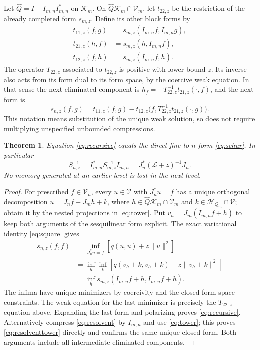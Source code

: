 \documentclass[11pt]{article}
\newtheorem{theorem}{Theorem}[section]
\newcommand{\HH}{\mathscr H}
\newcommand{\KK}{\mathscr K}
\newcommand{\LL}{\mathscr L}
\newcommand{\VV}{\mathscr V}
\begin{document}
Let $\widehat Q=I-I_{m,n}I_{m,n}^*$ on $\KK_m$. On
$\widehat Q\KK_m\cap\VV_m$, let $t_{22,z}$ be the restriction of the
already completed form $s_{m,z}$. Define its other block forms by
\begin{align*}
 t_{11,z}(f,g)&=s_{m,z}(I_{m,n}f,I_{m,n}g),\\
 t_{21,z}(h,f)&=s_{m,z}(h,I_{m,n}f),\\
 t_{12,z}(f,h)&=s_{m,z}(I_{m,n}f,h).
\end{align*}
The operator $T_{22,z}$ associated to $t_{22,z}$ is positive with lower
bound $z$. Its inverse also acts from its form dual to its form space,
by the coercive weak equation. In that sense the next eliminated component
is $h_f=-T_{22,z}^{-1}t_{21,z}(\cdot,f)$, and the next form is
\begin{equation}\label{eq:recursive}
 s_{n,z}(f,g)=t_{11,z}(f,g)
       -t_{12,z}\bigl(f,T_{22,z}^{-1}t_{21,z}(\cdot,g)\bigr).
\end{equation}
This notation means substitution of the unique weak solution, so does
not require multiplying unspecified unbounded compressions.

\begin{theorem}\label{thm:associative}
Equation \eqref{eq:recursive} equals the direct fine-to-$n$ form
\eqref{eq:schur}. In particular
\begin{equation}\label{eq:resolventtower}
 S_{n,z}^{-1}=I_{m,n}^*S_{m,z}^{-1}I_{m,n}
            =J_n^*(\LL+z)^{-1}J_n.
\end{equation}
No memory generated at an earlier level is lost in the next level.
\end{theorem}
\begin{proof}
For prescribed $f\in\VV_n$, every $u\in\VV$ with $J_n^*u=f$ has a
unique orthogonal decomposition
$u=J_n f+J_mh+k$, where $h\in\widehat Q\KK_m\cap\VV_m$ and
$k\in\HH_{Q_m}\cap\VV$; obtain it by the nested projections in
\eqref{eq:tower}. Put $v_h=J_m(I_{m,n}f+h)$ to keep both arguments
of the sesquilinear form explicit. The exact variational identity
\eqref{eq:square} gives
\begin{align*}
 s_{n,z}(f,f)
 &=\inf_{J_n^*u=f}[q(u,u)+z\|u\|^2]\\
 &=\inf_h\inf_k[q(v_h+k,v_h+k)+z\|v_h+k\|^2]\\
 &=\inf_h s_{m,z}(I_{m,n}f+h,I_{m,n}f+h).
\end{align*}
The infima have unique minimizers by coercivity and the closed form-space
constraints. The weak equation for the last minimizer is precisely the
$T_{22,z}$ equation above. Expanding the last form and polarizing proves
\eqref{eq:recursive}. Alternatively compress
\eqref{eq:resolvent} by $I_{m,n}$ and use \eqref{eq:tower}; this proves
\eqref{eq:resolventtower} directly and confirms the same unique closed
form. Both arguments include all intermediate eliminated components.
\end{proof}
\end{document}
